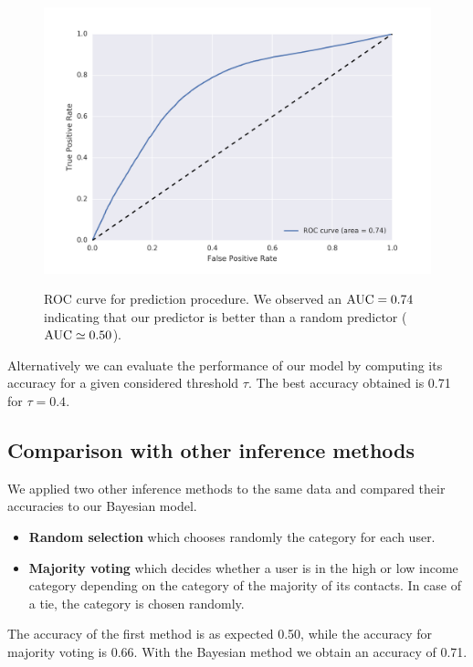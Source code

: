 

\begin{figure}[H]
\begin{center}
{\includegraphics[width=0.85\columnwidth,trim={1.0cm 0.5cm 1.9cm 0.9cm},clip=true]
{figures/ROC_BETA/ROC_Beta_based_approach_201504.png}
}
\caption{ROC curve for prediction procedure. We observed an $\operatorname{AUC} = 0.74$ indicating that our predictor is better than a random predictor ($\operatorname{AUC} \simeq 0.50$).}
\label{ROC_multiclass}
\end{center}
\end{figure}


Alternatively we can evaluate the performance of our model by computing its accuracy for a given considered threshold $\tau$. The best accuracy obtained is \num{0.71} for $\tau = 0.4$. 

\subsection{Comparison with other inference methods}

We applied two other inference methods to the same data and compared their accuracies to our Bayesian model.

\begin{itemize}
	\item \textbf{Random selection} which chooses randomly the category for each user.
	\item \textbf{Majority voting} which decides whether a user is in the high or low income category depending on the category of the majority of its contacts. In case of a tie, the category is chosen randomly.
\end{itemize}

The accuracy of the first method is as expected \num{0.50}, while the accuracy for majority voting is \num{0.66}. 
With the Bayesian method we obtain an accuracy of \num{0.71}.
